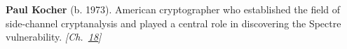 \textbf{Paul Kocher} (b. 1973). American cryptographer who established the field of side-channel cryptanalysis and played a central role in discovering the Spectre vulnerability. \emph{[Ch.~\hyperref[ch:speculativeexecutionattacks]{18}]}

